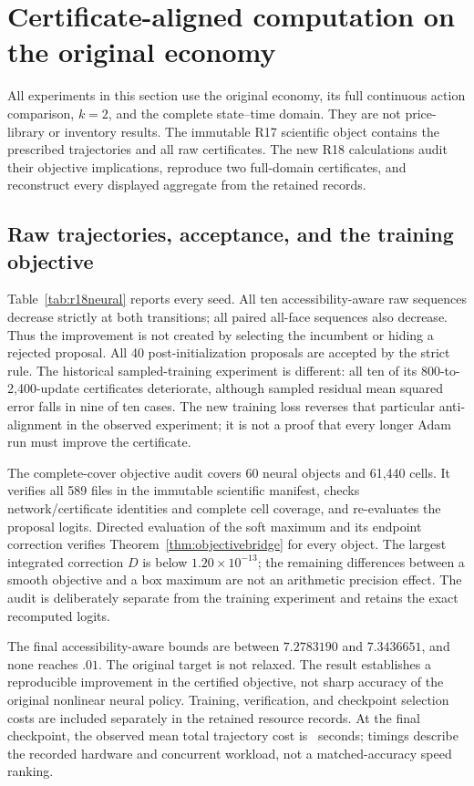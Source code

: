 \section{Certificate-aligned computation on the original economy}\label{sec:r18original}
All experiments in this section use the original economy, its full continuous action comparison, $k=2$, and the complete state--time domain. They are not price-library or inventory results. The immutable R17 scientific object contains the prescribed trajectories and all raw certificates. The new R18 calculations audit their objective implications, reproduce two full-domain certificates, and reconstruct every displayed aggregate from the retained records.

\subsection{Raw trajectories, acceptance, and the training objective}
Table~\ref{tab:r18neural} reports every seed. All ten accessibility-aware raw sequences decrease strictly at both transitions; all paired all-face sequences also decrease. Thus the improvement is not created by selecting the incumbent or hiding a rejected proposal. All 40 post-initialization proposals are accepted by the strict rule. The historical sampled-training experiment is different: all ten of its 800-to-2,400-update certificates deteriorate, although sampled residual mean squared error falls in nine of ten cases. The new training loss reverses that particular anti-alignment in the observed experiment; it is not a proof that every longer Adam run must improve the certificate.


The complete-cover objective audit covers 60 neural objects and 61,440 cells. It verifies all 589 files in the immutable scientific manifest, checks network/certificate identities and complete cell coverage, and re-evaluates the proposal logits. Directed evaluation of the soft maximum and its endpoint correction verifies Theorem~\ref{thm:objectivebridge} for every object. The largest integrated correction $D$ is below $1.20\times10^{-13}$; the remaining differences between a smooth objective and a box maximum are not an arithmetic precision effect. The audit is deliberately separate from the training experiment and retains the exact recomputed logits.

The final accessibility-aware bounds are between $7.2783190$ and $7.3436651$, and none reaches $.01$. The original target is not relaxed. The result establishes a reproducible improvement in the certified objective, not sharp accuracy of the original nonlinear neural policy. Training, verification, and checkpoint selection costs are included separately in the retained resource records. At the final checkpoint, the observed mean total trajectory cost is \RNewMeanWall\ seconds; timings describe the recorded hardware and concurrent workload, not a matched-accuracy speed ranking.

